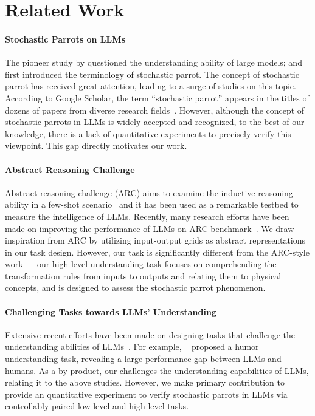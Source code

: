 \section{Related Work}



\paragraph{Stochastic Parrots on LLMs}
The pioneer study by \cite{bender2020climbing} questioned the understanding ability of large models; and \citet{bender2021dangers} first introduced the terminology of stochastic parrot.
The concept of stochastic parrot has received great attention, leading to a surge of studies on this topic. 
According to Google Scholar, the term ``stochastic parrot'' appears in the titles of dozens of papers from diverse research fields~\cite{borji2023stochastic,li2023dark,duan2024flocks,henrique2023stochastic}. 
However, although the concept of stochastic parrots in LLMs is widely accepted and recognized, to the best of our knowledge, there is a lack of quantitative experiments to precisely verify this viewpoint. This gap directly motivates our work.




\paragraph{Abstract Reasoning Challenge}

Abstract reasoning challenge (ARC) aims to examine the inductive reasoning ability in a few-shot scenario~\cite{chollet2019measure} and it has been used as a remarkable testbed to measure the intelligence of LLMs.
Recently, many research efforts have been made on improving the performance of LLMs on ARC benchmark~\cite{tan2023large,wang2023hypothesis,xu2023llms,mirchandani2023large,wang2024speak,huang2024anpl}. 
We draw inspiration from ARC by utilizing input-output grids as abstract representations in our task design. However, our task is significantly different from the ARC-style work --- our high-level understanding task focuses on comprehending the transformation rules from inputs to outputs and relating them to physical concepts, and is designed to assess the stochastic parrot phenomenon.


\paragraph{Challenging Tasks towards LLMs' Understanding}
Extensive recent efforts have been made on designing tasks that challenge the understanding abilities of LLMs~\cite{chakrabarty-etal-2022-flute,tong2024metaphor,shapira-etal-2023-well,hessel-etal-2023-androids,donadel2024can,li2024previously}. 
For example, %
~\citet{hessel-etal-2023-androids} proposed a humor understanding task, revealing a large performance gap between LLMs and humans.
As a by-product, our \datasetname challenges the understanding capabilities of LLMs, relating it to the above studies. 
However, we make primary contribution to provide an quantitative experiment to verify stochastic parrots in LLMs via controllably paired low-level and high-level tasks.

